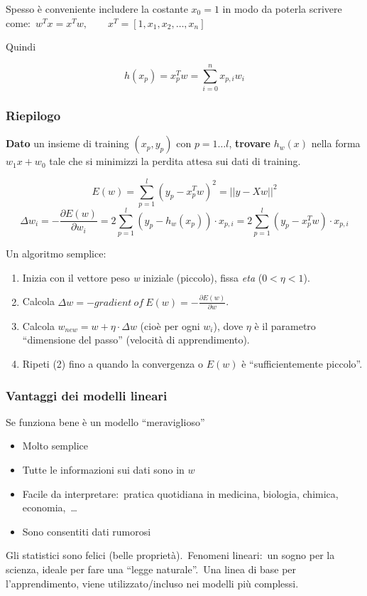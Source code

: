 \noindent Spesso è conveniente includere la costante $x_0 = 1$ in modo da poterla scrivere come:\ $w^Tx = x^Tw, \qquad x^T = [1, x_1, x_2, \dots, x_n]$

\noindent Quindi

\[ h(x_p)= x_p^Tw = \sum_{i=0}^n x_{p,i}w_i\]

\subsubsection{Riepilogo}

\textbf{Dato} un insieme di training $(x_p, y_p)$ con $p = 1\dots l$, \textbf{trovare} $h_w(x)$ nella forma $w_1x + w_0$ tale che si minimizzi la perdita attesa sui dati di training.

\[ E(w) = \sum_{p=1}^l (y_p -x_p^Tw)^2 = || y -Xw||^2 \]
\[ \Delta w_i = -\frac{\partial E(w)}{\partial w_i} = 2 \sum_{p=1}^l (y_p -h_w(x_p)) \cdot x_{p,i} = 2 \sum_{p=1}^l (y_p - x_p^Tw) \cdot x_{p,i}\]

\noindent Un algoritmo semplice:

\begin{enumerate}
	\item Inizia con il vettore peso \textit{w} iniziale (piccolo), fissa \textit{eta} ($0 < \eta <1$).
	\item Calcola $\Delta w = - gradient \ of\ E(w) = - \frac{\partial E(w)}{\partial w}$.
	\item Calcola $w_{new} = w + \eta \cdot \Delta w$ (cioè per ogni $w_i$), dove $\eta$ è il parametro ``dimensione del passo'' (velocità di apprendimento).
	\item Ripeti (2) fino a quando la convergenza o $E(w)$ è ``sufficientemente piccolo''.
\end{enumerate}

\subsubsection{Vantaggi dei modelli lineari}

Se funziona bene è un modello ``meraviglioso''
\begin{itemize}
	\item Molto semplice
	\item Tutte le informazioni sui dati sono in $w$
	\item Facile da interpretare:\ pratica quotidiana in medicina, biologia, chimica, economia,\ \dots
	\item Sono consentiti dati rumorosi
\end{itemize}
Gli statistici sono felici (belle proprietà).\
Fenomeni lineari:\ un sogno per la scienza, ideale per fare una ``legge naturale''.\
Una linea di base per l'apprendimento, viene utilizzato/incluso nei modelli più complessi.

